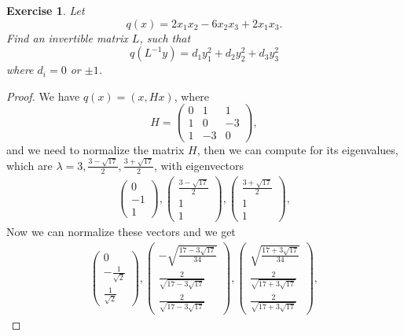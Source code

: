 \documentclass[11pt]{book}
\newtheorem{exercise}{Exercise}[section]
\theoremstyle{definition}
\numberwithin{equation}{chapter}
\begin{document}
\begin{exercise}
Let%
$$
q\left(x\right) = 2x_{1}x_{2}-6x_{2}x_{3}+2x_{1}x_{3}.
$$
Find an invertible matrix $L$, such that%
$$
q\left(  L^{-1}y\right)  =d_{1}y_{1}^{2}+d_{2}y_{2}^{2}+d_{3}y_{3}^{2}%
$$
where $d_{i}=0$ or $\pm1$.
\end{exercise}
\begin{proof}
We have $q(x) = (x,Hx)$, where 
$$
H = \left(
\begin{matrix}
0 & 1 & 1\\
1 & 0 & -3\\
1 & -3 & 0
\end{matrix}
\right),
$$
and we need to normalize the matrix $H$, then we can compute for its eigenvalues, which are $\lambda = 3, \frac{3-\sqrt{17}}{2}, \frac{3+\sqrt{17}}{2}$, with eigenvectors 
\begin{align*}
    \left(\begin{matrix} 0 \\ - 1\\ 1 
    \end{matrix}\right), 
    \left(\begin{matrix} \frac{3-\sqrt{17}}{2} \\ 1\\ 1 
    \end{matrix}\right), 
    \left(\begin{matrix} \frac{3+\sqrt{17}}{2} \\ 1\\ 1 
    \end{matrix}\right), 
\end{align*}
Now we can normalize these vectors and we get 
\begin{align*}
    \left(\begin{matrix} 0 \\ - \frac{1}{\sqrt{2}}\\ \frac{1}{\sqrt{2}} 
    \end{matrix}\right), 
    \left(\begin{matrix} -\sqrt{\frac{17-3\sqrt{17}}{34}} \\ \frac{2}{\sqrt{17-3\sqrt{17}}}\\ \frac{2}{\sqrt{17-3\sqrt{17}}} 
    \end{matrix}\right), 
    \left(\begin{matrix} \sqrt{\frac{17+3\sqrt{17}}{34}} \\ \frac{2}{\sqrt{17+3\sqrt{17}}} \\ \frac{2}{\sqrt{17+3\sqrt{17}}} 
    \end{matrix}\right), 

\end{align*}
\end{proof}
\end{document}
